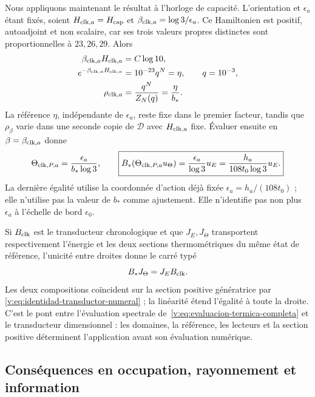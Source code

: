 Nous appliquons maintenant le résultat à l’horloge de capacité. L’orientation
et $\epsilon_a$ étant fixés, soient $H_{{\rm clk},a}=H_{\rm cap}$ et
$\beta_{{\rm clk},a}=\log3/\epsilon_a$. Ce Hamiltonien est positif,
autoadjoint et non scalaire, car ses trois valeurs propres distinctes sont
proportionnelles à $23,26,29$. Alors
\begin{align}
 \beta_{{\rm clk},a}H_{{\rm clk},a}
   &=C\log10,\nonumber\\
 e^{-\beta_{{\rm clk},a}H_{{\rm clk},a}}
   &=10^{-23}q^N=\eta,\qquad q=10^{-3},\nonumber\\
 \rho_{{\rm clk},a}
   &=\frac{q^N}{Z_N(q)}=\frac{\eta}{b_*}.
 \label{v:eq:estado-reloj-capacidad}
\end{align}
La référence $\eta$, indépendante de $\epsilon_a$, reste fixe dans le
premier facteur, tandis que $\rho_\beta$ varie dans une seconde copie de
$\mathcal D$ avec $H_{{\rm clk},a}$ fixe. Évaluer ensuite en
$\beta=\beta_{{\rm clk},a}$ donne
\begin{equation}
 \Theta_{{\rm clk},P,a}=\frac{\epsilon_a}{b_*\log3},
 \qquad
 \boxed{B_*(\Theta_{{\rm clk},P,a}u_\Theta)
 =\frac{\epsilon_a}{\log3}u_E
 =\frac{h_a}{108t_0\log3}u_E.}
 \label{v:eq:identidad-transductor-numeral}
\end{equation}
La dernière égalité utilise la coordonnée d’action déjà fixée
$\epsilon_a=h_a/(108t_0)$ ; elle n’utilise pas la valeur de $b_*$ comme ajustement. Elle n’identifie pas non plus
$\epsilon_a$ à l’échelle de bord $\epsilon_0$.

Si $B_{\rm clk}$ est le transducteur chronologique et que $J_E,J_\Theta$ transportent
respectivement l’énergie et les deux sections thermométriques du même état
de référence, l’unicité entre droites donne le carré typé
\begin{equation}
 B_*J_\Theta=J_EB_{\rm clk}.
 \label{v:eq:cuadrado-transductor-marcado}
\end{equation}
Les deux compositions coïncident sur la section positive génératrice par
\eqref{v:eq:identidad-transductor-numeral} ; la linéarité étend
l’égalité à toute la droite. C’est le pont entre l’évaluation spectrale
de~\eqref{v:eq:evaluacion-termica-completa} et le transducteur dimensionnel :
les domaines, la référence, les lecteurs et la section positive déterminent l’application avant
son évaluation numérique.

\subsection{Conséquences en occupation, rayonnement et information}

